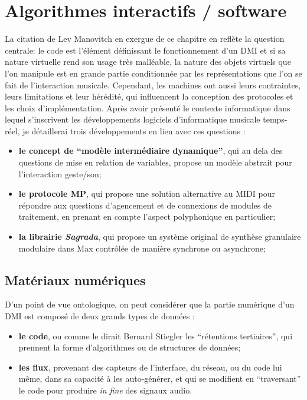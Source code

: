 %
\chapter{Algorithmes interactifs / software}
\label{ch:algorithms}



\noindent La citation de Lev Manovitch en exergue de ce chapitre en reflète la question centrale: le code est l'élément définissant le fonctionnement d'un \gls{DMI} et si sa nature virtuelle rend son usage très malléable, la nature des objets virtuels que l'on manipule est en grande partie conditionnée par les représentations que l'on se fait de l'interaction musicale. Cependant, les machines ont aussi leurs contraintes, leurs limitations et leur hérédité, qui influencent la conception des protocoles et les choix d'implémentation. Après avoir présenté le contexte informatique dans lequel s'inscrivent les développements logiciels d'informatique musicale temps-réel, je détaillerai trois développements en lien avec ces questions :
\vspace{-1em}
\begin{itemize}[noitemsep]
	\item \textbf{le concept de ``modèle intermédiaire dynamique''}, qui au dela des questions de mise en relation de variables, propose un modèle abstrait pour l'interaction geste/son;
	\item \textbf{le protocole MP}, qui propose une solution alternative au \gls{MIDI} pour répondre aux questions d'agencement et de connexions de modules de traitement, en prenant en compte l'aspect polyphonique en particulier;
	\item \textbf{la librairie \textit{Sagrada}}, qui propose un système original de synthèse granulaire modulaire dans Max contrôlée de manière synchrone ou asynchrone;
\end{itemize}

\section{Matériaux numériques}

\noindent D'un point de vue ontologique, on peut considérer que la partie numérique d'un \gls{DMI} est composé de deux grands types de données :
\vspace{-1em}
\begin{itemize}[noitemsep]
	\item \textbf{le code}, ou comme le dirait Bernard Stiegler les ``rétentions tertiaires'', qui prennent la forme d'algorithmes ou de structures de données;
	\item \textbf{les flux}, provenant des capteurs de l'interface, du réseau, ou du code lui même, dans sa capacité à les auto-générer, et qui se modifient en ``traversant'' le code pour produire \textit{in fine} des signaux audio.
\end{itemize}

